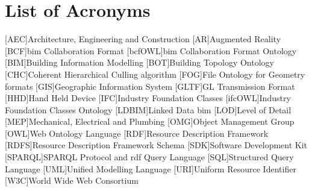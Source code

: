 \documentclass[12pt,a4paper,faculty=ea,language=en,doctype=report]{ugent-doc}
\renewcommand{\ULthickness}{2pt} %
\begin{document}
\maketitle
\renewcommand{\ULthickness}{1pt}
\normalem
{\hypersetup{hidelinks}
  \tableofcontents
  \listoffigures
  \let\clearpage\relax
  \listoftables
}

\newpage









% 
\clearpage
\chapter*{List of Acronyms}
\begin{acronym}[JSONP]\itemsep2pt\hypersetup{hidelinks}
  [AEC]{Architecture, Engineering and Construction}
  [AR]{Augmented Reality}
  [BCF]{\acs{bim} Collaboration Format}
  [bcfOWL]{\acs{bim} Collaboration Format Ontology}
  [BIM]{Building Information Modelling}
  [BOT]{Building Topology Ontology}
  [CHC]{Coherent Hierarchical Culling algorithm}
  [FOG]{File Ontology for Geometry formats}
  [GIS]{Geographic Information System}
  [GLTF]{GL Transmission Format}
  [HHD]{Hand Held Device}
  [IFC]{Industry Foundation Classes}
  [ifcOWL]{Industry Foundation Classes Ontology}
  [LDBIM]{Linked Data \acs{bim}}
  [LOD]{Level of Detail}
  [MEP]{Mechanical, Electrical and Plumbing}
  [OMG]{Object Management Group}
  [OWL]{Web Ontology Language}
  [RDF]{Resource Description Framework}
  [RDFS]{Resource Description Framework Schema}
  [SDK]{Software Development Kit}
  [SPARQL]{SPARQL Protocol and \acs{rdf} Query Language}
  [SQL]{Structured Query Language}
  [UML]{Unified Modelling Language}
  [URI]{Uniform Resource Identifier}
  [W3C]{World Wide Web Consortium}
\end{acronym}

\printbibliography[nottype=web_page, heading=bibintoc,title={References}]
\printbibliography[type=web_page, heading=bibintoc, title={Referenced webistes}]
\end{document}
